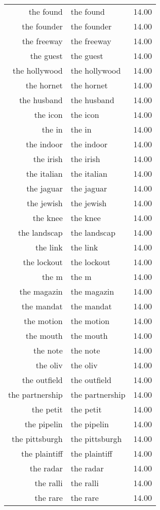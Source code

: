 \begin{table}[ht]
\begin{tabular}{rlr}
  the found & the found & 14.00 \\ 
  the founder & the founder & 14.00 \\ 
  the freeway & the freeway & 14.00 \\ 
  the guest & the guest & 14.00 \\ 
  the hollywood & the hollywood & 14.00 \\ 
  the hornet & the hornet & 14.00 \\ 
  the husband & the husband & 14.00 \\ 
  the icon & the icon & 14.00 \\ 
  the in & the in & 14.00 \\ 
  the indoor & the indoor & 14.00 \\ 
  the irish & the irish & 14.00 \\ 
  the italian & the italian & 14.00 \\ 
  the jaguar & the jaguar & 14.00 \\ 
  the jewish & the jewish & 14.00 \\ 
  the knee & the knee & 14.00 \\ 
  the landscap & the landscap & 14.00 \\ 
  the link & the link & 14.00 \\ 
  the lockout & the lockout & 14.00 \\ 
  the m & the m & 14.00 \\ 
  the magazin & the magazin & 14.00 \\ 
  the mandat & the mandat & 14.00 \\ 
  the motion & the motion & 14.00 \\ 
  the mouth & the mouth & 14.00 \\ 
  the note & the note & 14.00 \\ 
  the oliv & the oliv & 14.00 \\ 
  the outfield & the outfield & 14.00 \\ 
  the partnership & the partnership & 14.00 \\ 
  the petit & the petit & 14.00 \\ 
  the pipelin & the pipelin & 14.00 \\ 
  the pittsburgh & the pittsburgh & 14.00 \\ 
  the plaintiff & the plaintiff & 14.00 \\ 
  the radar & the radar & 14.00 \\ 
  the ralli & the ralli & 14.00 \\ 
  the rare & the rare & 14.00 \\ 

\end{tabular}
\end{table}
